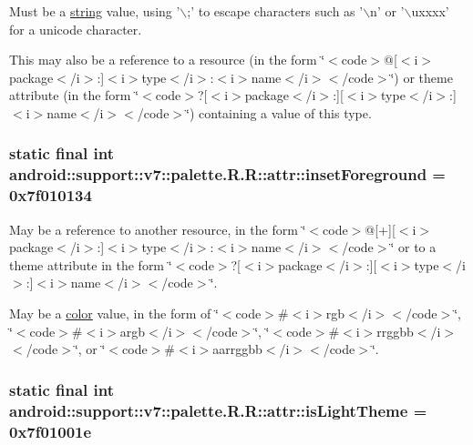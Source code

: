Must be a \hyperlink{classandroid_1_1support_1_1v7_1_1palette_1_1_r_1_1string}{string} value, using '$\backslash$;' to escape characters such as '$\backslash$n' or '$\backslash$uxxxx' for a unicode character. 

This may also be a reference to a resource (in the form \char`\"{}$<$code$>$@\mbox{[}$<$i$>$package$<$/i$>$:\mbox{]}$<$i$>$type$<$/i$>$:$<$i$>$name$<$/i$>$$<$/code$>$\char`\"{}) or theme attribute (in the form \char`\"{}$<$code$>$?\mbox{[}$<$i$>$package$<$/i$>$:\mbox{]}\mbox{[}$<$i$>$type$<$/i$>$:\mbox{]}$<$i$>$name$<$/i$>$$<$/code$>$\char`\"{}) containing a value of this type. \hypertarget{classandroid_1_1support_1_1v7_1_1palette_1_1_r_1_1attr_6024e29fbbd9c528df9f1f5fb00ddfbd}{
\subsubsection[{insetForeground}]{\setlength{\rightskip}{0pt plus 5cm}static final int android::support::v7::palette.R.R::attr::insetForeground = 0x7f010134}}
\label{classandroid_1_1support_1_1v7_1_1palette_1_1_r_1_1attr_6024e29fbbd9c528df9f1f5fb00ddfbd}


May be a reference to another resource, in the form \char`\"{}$<$code$>$@\mbox{[}+\mbox{]}\mbox{[}$<$i$>$package$<$/i$>$:\mbox{]}$<$i$>$type$<$/i$>$:$<$i$>$name$<$/i$>$$<$/code$>$\char`\"{} or to a theme attribute in the form \char`\"{}$<$code$>$?\mbox{[}$<$i$>$package$<$/i$>$:\mbox{]}\mbox{[}$<$i$>$type$<$/i$>$:\mbox{]}$<$i$>$name$<$/i$>$$<$/code$>$\char`\"{}. 

May be a \hyperlink{classandroid_1_1support_1_1v7_1_1palette_1_1_r_1_1color}{color} value, in the form of \char`\"{}$<$code$>$\#$<$i$>$rgb$<$/i$>$$<$/code$>$\char`\"{}, \char`\"{}$<$code$>$\#$<$i$>$argb$<$/i$>$$<$/code$>$\char`\"{}, \char`\"{}$<$code$>$\#$<$i$>$rrggbb$<$/i$>$$<$/code$>$\char`\"{}, or \char`\"{}$<$code$>$\#$<$i$>$aarrggbb$<$/i$>$$<$/code$>$\char`\"{}. \hypertarget{classandroid_1_1support_1_1v7_1_1palette_1_1_r_1_1attr_5c8e5c337c64764beff6d3c3068e3cfc}{
\subsubsection[{isLightTheme}]{\setlength{\rightskip}{0pt plus 5cm}static final int android::support::v7::palette.R.R::attr::isLightTheme = 0x7f01001e}}
\label{classandroid_1_1support_1_1v7_1_1palette_1_1_r_1_1attr_5c8e5c337c64764beff6d3c3068e3cfc}


